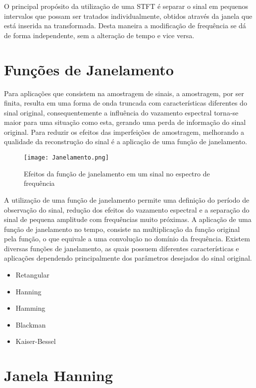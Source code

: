 O principal propósito da utilização de uma STFT é separar o sinal em pequenos intervalos que possam ser tratados individualmente, obtidos através da janela que está inserida na transformada. Desta maneira a modificação de frequência se dá de forma independente, sem a alteração de tempo e vice versa. 

\section*{Funções de Janelamento}
Para aplicações que consistem na amostragem de sinais, a amostragem, por ser finita, resulta em uma forma de onda truncada com características diferentes do sinal original, consequentemente a influência do vazamento espectral torna-se maior para uma situação como esta, gerando uma perda de informação do sinal original. 
Para reduzir os efeitos das imperfeições de amostragem, melhorando a qualidade da reconstrução do sinal é a aplicação de uma função de janelamento.

\begin{figure}[h]
	\centering
	\texttt{[image: Janelamento.png]}
	\label{fig:Janelamento}
	\caption{Efeitos da função de janelamento em um sinal no espectro de frequência}
\end{figure}
 \newpage

A utilização de uma função de janelamento permite uma definição do período de observação do sinal, redução dos efeitos do vazamento espectral e a separação do sinal de pequena amplitude com frequências muito próximas. A aplicação de uma função de janelamento no tempo, consiste na multiplicação da função original pela função, o que equivale a uma convolução no domínio da frequência.
Existem diversas funções de janelamento, as quais possuem diferentes características e aplicações dependendo principalmente dos parâmetros desejados do sinal original.

\begin{itemize}
	\item Retangular
	\item Hanning
	\item Hamming
	\item Blackman
	\item Kaiser-Bessel
\end{itemize}
 
\section*{Janela Hanning}

